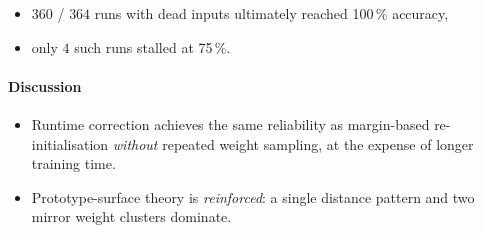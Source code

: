\begin{itemize}
  \item $360$ / $364$ runs with dead inputs ultimately reached
        100\,\% accuracy,
  \item only $4$ such runs stalled at 75\,\%.
\end{itemize}

\paragraph{Discussion}
\begin{itemize}
  \item Runtime correction achieves the same reliability as
        margin-based re-initialisation \emph{without} repeated weight
        sampling, at the expense of longer training time.
  \item Prototype-surface theory is \emph{reinforced}: a single distance
        pattern and two mirror weight clusters dominate.
\end{itemize}

\hrulefill
